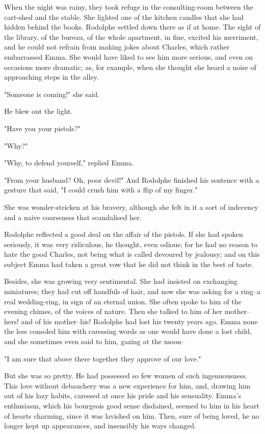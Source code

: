 \documentclass{tufte-book}
\begin{document}
When the night was rainy, they took refuge in the consulting-room
between the cart-shed and the stable. She lighted one of the kitchen
candles that she had hidden behind the books. Rodolphe settled down
there as if at home. The sight of the library, of the bureau, of the
whole apartment, in fine, excited his merriment, and he could not
refrain from making jokes about Charles, which rather embarrassed Emma.
She would have liked to see him more serious, and even on occasions
more dramatic; as, for example, when she thought she heard a noise of
approaching steps in the alley.

"Someone is coming!" she said.

He blew out the light.

"Have you your pistols?"

"Why?"

"Why, to defend yourself," replied Emma.

"From your husband? Oh, poor devil!" And Rodolphe finished his sentence
with a gesture that said, "I could crush him with a flip of my finger."

She was wonder-stricken at his bravery, although she felt in it a sort
of indecency and a naive coarseness that scandalised her.

Rodolphe reflected a good deal on the affair of the pistols. If she had
spoken seriously, it was very ridiculous, he thought, even odious; for
he had no reason to hate the good Charles, not being what is called
devoured by jealousy; and on this subject Emma had taken a great vow
that he did not think in the best of taste.

Besides, she was growing very sentimental. She had insisted on
exchanging miniatures; they had cut off handfuls of hair, and now she
was asking for a ring--a real wedding-ring, in sign of an eternal union.
She often spoke to him of the evening chimes, of the voices of nature.
Then she talked to him of her mother--hers! and of his mother--his!
Rodolphe had lost his twenty years ago. Emma none the less consoled
him with caressing words as one would have done a lost child, and she
sometimes even said to him, gazing at the moon--

"I am sure that above there together they approve of our love."

But she was so pretty. He had possessed so few women of such
ingenuousness. This love without debauchery was a new experience for
him, and, drawing him out of his lazy habits, caressed at once his pride
and his sensuality. Emma's enthusiasm, which his bourgeois good sense
disdained, seemed to him in his heart of hearts charming, since it
was lavished on him. Then, sure of being loved, he no longer kept up
appearances, and insensibly his ways changed.
\end{document}
